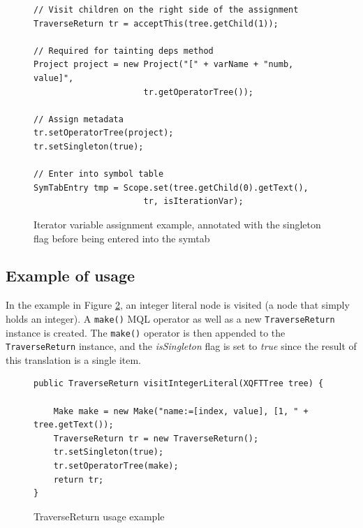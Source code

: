 \begin{figure}[!htp]
\begin{center}
\begin{Verbatim}
// Visit children on the right side of the assignment
TraverseReturn tr = acceptThis(tree.getChild(1));

// Required for tainting deps method
Project project = new Project("[" + varName + "numb, value]", 
                      tr.getOperatorTree());

// Assign metadata
tr.setOperatorTree(project);
tr.setSingleton(true);

// Enter into symbol table
SymTabEntry tmp = Scope.set(tree.getChild(0).getText(), 
                      tr, isIterationVar);
\end{Verbatim}
  \caption[Iterator variable annontion with singleton flag]{Iterator variable
  assignment example, annotated with the singleton flag before being entered into the symtab}
  \label{fig:impl:meta:var_assign_ex}
\end{center}
\end{figure}

\subsection{Example of usage}
In the example in Figure \ref{fig:impl:meta:traverse_usage_ex}, an
integer literal node is visited (a node that simply holds an integer). A
\texttt{make()} MQL operator as well as a new \texttt{TraverseReturn}
instance is created. The \texttt{make()} operator is then appended to the 
\texttt{TraverseReturn} instance, and the \textit{isSingleton} flag is set to 
\textit{true} since the result of this translation is a single item.

\begin{figure}[!htp]
\begin{center}
\begin{Verbatim}
public TraverseReturn visitIntegerLiteral(XQFTTree tree) {

    Make make = new Make("name:=[index, value], [1, " + tree.getText());
    TraverseReturn tr = new TraverseReturn();        
    tr.setSingleton(true);
    tr.setOperatorTree(make);
    return tr;
}
\end{Verbatim}
  \caption{TraverseReturn usage example}
  \label{fig:impl:meta:traverse_usage_ex}
\end{center}
\end{figure}